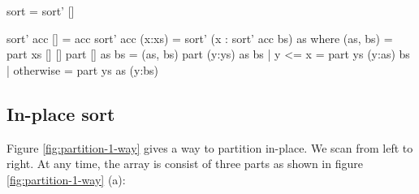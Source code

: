 \documentclass[b5paper]{article}
\begin{document}
\begin{Haskell}
sort = sort' []

sort' acc [] = acc
sort' acc (x:xs) = sort' (x : sort' acc bs) as where
  (as, bs) = part xs [] []
  part [] as bs = (as, bs)
  part (y:ys) as bs | y <= x = part ys (y:as) bs
                    | otherwise = part ys as (y:bs)
\end{Haskell}

\subsection{In-place sort}

Figure \ref{fig:partition-1-way} gives a way to partition in-place\cite{Bentley}\cite{CLRS}. We scan from left to right. At any time, the array is consist of three parts as shown in figure \ref{fig:partition-1-way} (a):
\end{document}
